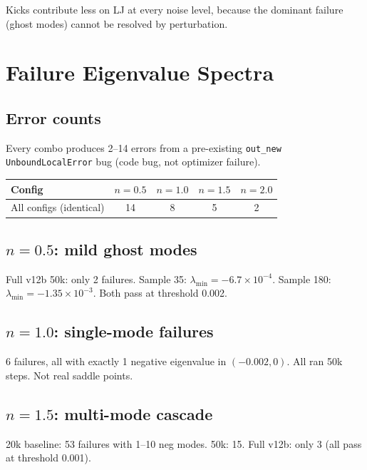 \documentclass[11pt,a4paper]{article}
\theoremstyle{definition}
\begin{document}
Kicks contribute less on LJ at every noise level, because the dominant
failure (ghost modes) cannot be resolved by perturbation.

\section{Failure Eigenvalue Spectra}
\label{app:failures}

\subsection{Error counts}

Every combo produces 2--14 errors from a pre-existing \texttt{out\_new}
\texttt{UnboundLocalError} bug (code bug, not optimizer failure).

\begin{center}\small
\begin{tabular}{lcccc}
\toprule
Config & $n{=}0.5$ & $n{=}1.0$ & $n{=}1.5$ & $n{=}2.0$ \\
\midrule
All configs (identical) & 14 & 8 & 5 & 2 \\
\bottomrule
\end{tabular}
\end{center}

\subsection{$n{=}0.5$: mild ghost modes}

Full v12b 50k: only 2 failures.  Sample 35:
$\lambda_\text{min} = -6.7 \times 10^{-4}$.
Sample 180: $\lambda_\text{min} = -1.35 \times 10^{-3}$.
Both pass at threshold 0.002.

\subsection{$n{=}1.0$: single-mode failures}

6 failures, all with exactly 1 negative eigenvalue in $(-0.002, 0)$.
All ran 50k steps.  Not real saddle points.

\subsection{$n{=}1.5$: multi-mode cascade}

20k baseline: 53 failures with 1--10 neg modes.  50k: 15.
Full v12b: only 3 (all pass at threshold 0.001).
\end{document}
